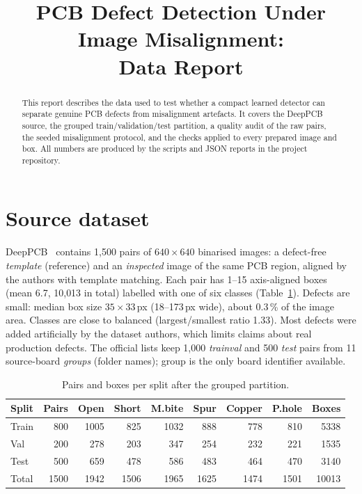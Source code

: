 \documentclass[10pt,conference]{IEEEtran}
\begin{document}
\title{PCB Defect Detection Under Image Misalignment:\\ Data Report}
\author{
}
\maketitle

\begin{abstract}
This report describes the data used to test whether a compact learned detector can separate genuine PCB defects
from misalignment artefacts. It covers the DeepPCB source, the grouped train/validation/test partition, a quality
audit of the raw pairs, the seeded misalignment protocol, and the checks applied to every prepared image and box.
All numbers are produced by the scripts and JSON reports in the project repository.
\end{abstract}

\section{Source dataset}
DeepPCB~\cite{tang2019} contains 1{,}500 pairs of $640\times640$ binarised images: a defect-free \emph{template}
(reference) and an \emph{inspected} image of the same PCB region, aligned by the authors with template matching.
Each pair has 1--15 axis-aligned boxes (mean 6.7, 10{,}013 in total) labelled with one of six classes
(Table~\ref{tab:counts}). Defects are small: median box size $35\times33$\,px (18--173\,px wide), about 0.3\,\% of
the image area. Classes are close to balanced (largest/smallest ratio 1.33). Most defects were added artificially by
the dataset authors, which limits claims about real production defects. The official lists keep 1{,}000
\emph{trainval} and 500 \emph{test} pairs from 11 source-board \emph{groups} (folder names); group is the only
board identifier available.

\begin{table}[t]
\centering\footnotesize
\caption{Pairs and boxes per split after the grouped partition.}
\label{tab:counts}
\begin{tabular}{@{}lrrrrrrrr@{}}
\toprule
Split & Pairs & Open & Short & M.bite & Spur & Copper & P.hole & Boxes\\
\midrule
Train & 800 & 1005 & 825 & 1032 & 888 & 778 & 810 & 5338\\
Val   & 200 &  278 & 203 &  347 & 254 & 232 & 221 & 1535\\
Test  & 500 &  659 & 478 &  586 & 483 & 464 & 470 & 3140\\
\midrule
Total & 1500 & 1942 & 1506 & 1965 & 1625 & 1474 & 1501 & 10013\\
\bottomrule
\end{tabular}
\end{table}
\end{document}

